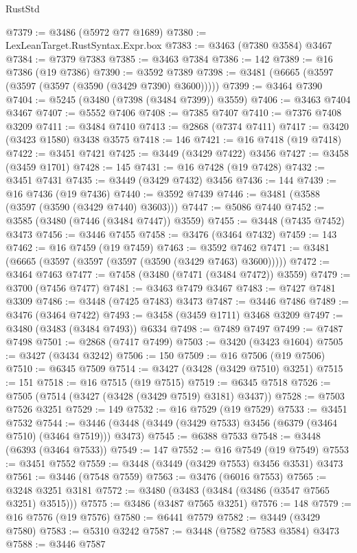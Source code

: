 \begin{lexlean}{RustStd}
\begin{coremodule}
{{{{{{{{{{{{{{{{{{{@7379 := @3486 (@5972 @77 @1689)
@7380 := LexLeanTarget.RustSyntax.Expr.box
@7383 := @3463 (@7380 @3584) @3467
@7384 := @7379 @7383
@7385 := @3463 @7384
@7386 := 142
@7389 := @16 @7386 (@19 @7386)
@7390 := @3592 @7389
@7398 := @3481 (@6665 (@3597 (@3597 (@3597 (@3590 (@3429 @7390) @3600)))))
@7399 := @3464 @7390
@7404 := @5245 (@3480 (@7398 (@3484 @7399)) @3559)
@7406 := @3463 @7404 @3467
@7407 := @5552 @7406
@7408 := @7385 @7407
@7410 := @7376 @7408 @3209
@7411 := @3484 @7410
@7413 := @2868 (@7374 @7411)
@7417 := @3420 (@3423 @1580) @3438 @3575
@7418 := 146
@7421 := @16 @7418 (@19 @7418)
@7422 := @3451 @7421
@7425 := @3449 (@3429 @7422) @3456
@7427 := @3458 (@3459 @1701)
@7428 := 145
@7431 := @16 @7428 (@19 @7428)
@7432 := @3451 @7431
@7435 := @3449 (@3429 @7432) @3456
@7436 := 144
@7439 := @16 @7436 (@19 @7436)
@7440 := @3592 @7439
@7446 := @3481 (@3588 (@3597 (@3590 (@3429 @7440) @3603)))
@7447 := @5086 @7440
@7452 := @3585 (@3480 (@7446 (@3484 @7447)) @3559)
@7455 := @3448 (@7435 @7452) @3473
@7456 := @3446 @7455
@7458 := @3476 (@3464 @7432)
@7459 := 143
@7462 := @16 @7459 (@19 @7459)
@7463 := @3592 @7462
@7471 := @3481 (@6665 (@3597 (@3597 (@3597 (@3590 (@3429 @7463) @3600)))))
@7472 := @3464 @7463
@7477 := @7458 (@3480 (@7471 (@3484 @7472)) @3559)
@7479 := @3700 (@7456 @7477)
@7481 := @3463 @7479 @3467
@7483 := @7427 @7481 @3309
@7486 := @3448 (@7425 @7483) @3473
@7487 := @3446 @7486
@7489 := @3476 (@3464 @7422)
@7493 := @3458 (@3459 @1711) @3468 @3209
@7497 := @3480 (@3483 (@3484 @7493)) @6334
@7498 := @7489 @7497
@7499 := @7487 @7498
@7501 := @2868 (@7417 @7499)
@7503 := @3420 (@3423 @1604)
@7505 := @3427 (@3434 @3242)
@7506 := 150
@7509 := @16 @7506 (@19 @7506)
@7510 := @6345 @7509
@7514 := @3427 (@3428 (@3429 @7510) @3251)
@7515 := 151
@7518 := @16 @7515 (@19 @7515)
@7519 := @6345 @7518
@7526 := @7505 (@7514 (@3427 (@3428 (@3429 @7519) @3181) @3437))
@7528 := @7503 @7526 @3251
@7529 := 149
@7532 := @16 @7529 (@19 @7529)
@7533 := @3451 @7532
@7544 := @3446 (@3448 (@3449 (@3429 @7533) @3456 (@6379 (@3464 @7510) (@3464 @7519))) @3473)
@7545 := @6388 @7533
@7548 := @3448 (@6393 (@3464 @7533))
@7549 := 147
@7552 := @16 @7549 (@19 @7549)
@7553 := @3451 @7552
@7559 := @3448 (@3449 (@3429 @7553) @3456 @3531) @3473
@7561 := @3446 (@7548 @7559)
@7563 := @3476 (@6016 @7553)
@7565 := @3248 @3251 @3181
@7572 := @3480 (@3483 (@3484 (@3486 (@3547 @7565 @3251) @3515)))
@7575 := @3486 (@3487 @7565 @3251)
@7576 := 148
@7579 := @16 @7576 (@19 @7576)
@7580 := @6441 @7579
@7582 := @3449 (@3429 @7580)
@7583 := @5310 @3242
@7587 := @3448 (@7582 @7583 @3584) @3473
@7588 := @3446 @7587
}}}}}}}}}}}}}}}}}}}
\end{coremodule}
\end{lexlean}
